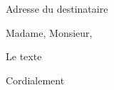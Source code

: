 \documentclass[a4paper, 11pt]{lettre}
\begin{document}
\begin{letter}{Adresse du destinataire}

\name{}
\address{}
\date{\today}
\email{}
\lieu{}
\telephone{}
\fax{}

\def\concname{Objet : }
\opening{Madame, Monsieur,}

Le texte

\signature{Quentin RIBAC}

\closing{Cordialement}


\end{letter}
\end{document}
